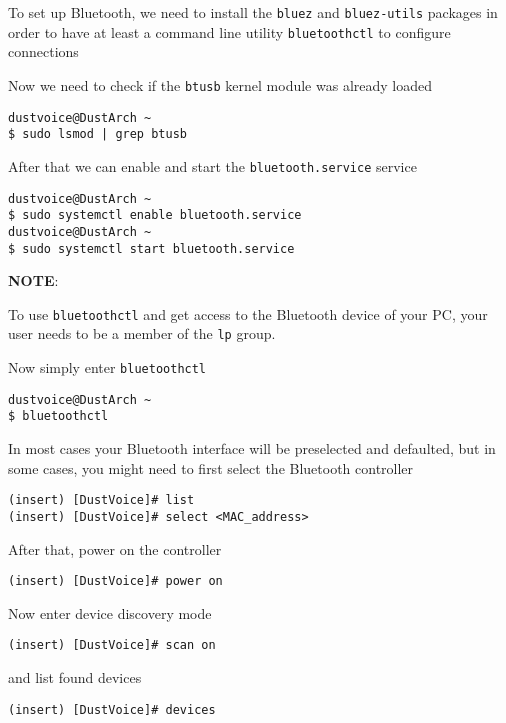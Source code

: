 \documentclass[9pt]{report}
\newcommand{\admonition}[2]{\textbf{#1}: {#2}}
\begin{document}
To set up Bluetooth, we need to install the \texttt{bluez} and \texttt{bluez-utils} packages in order to have at least a command line utility \texttt{bluetoothctl} to configure connections


Now we need to check if the \texttt{btusb} kernel module was already loaded


\begin{verbatim}
dustvoice@DustArch ~
$ sudo lsmod | grep btusb
\end{verbatim}

After that we can enable and start the \texttt{bluetooth.service} service


\begin{verbatim}
dustvoice@DustArch ~
$ sudo systemctl enable bluetooth.service
dustvoice@DustArch ~
$ sudo systemctl start bluetooth.service
\end{verbatim}

\admonition{NOTE}{To use \texttt{bluetoothctl} and get access to the Bluetooth device of your PC, your user needs to be a member of the \texttt{lp} group.

}
Now simply enter \texttt{bluetoothctl}


\begin{verbatim}
dustvoice@DustArch ~
$ bluetoothctl
\end{verbatim}

In most cases your Bluetooth interface will be preselected and defaulted, but in some cases, you might need to first select the Bluetooth controller


\begin{verbatim}
(insert) [DustVoice]# list
(insert) [DustVoice]# select <MAC_address>
\end{verbatim}

After that, power on the controller


\begin{verbatim}
(insert) [DustVoice]# power on
\end{verbatim}

Now enter device discovery mode


\begin{verbatim}
(insert) [DustVoice]# scan on
\end{verbatim}

and list found devices


\begin{verbatim}
(insert) [DustVoice]# devices
\end{verbatim}
\end{document}
